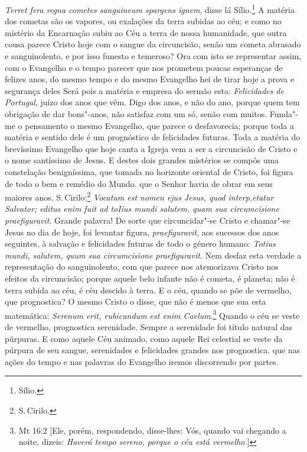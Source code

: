\emph{Terret fera regna cometes sanguineum spargens ignem}, disse lá
Sílio.\footnote{Sílio.} A matéria dos cometas são os vapores, ou exalações da terra
subidas ao céu; e como no mistério da Encarnação subiu ao Céu a terra de
nossa humanidade, que outra cousa parece Cristo hoje com o sangue da
circuncisão, senão um cometa abrasado e sanguinolento, e por isso
funesto e temeroso? Ora com isto se representar assim, com o Evangelho e
o tempo parecer que nos prometem poucas esperanças de felizes anos, do
mesmo tempo e do mesmo Evangelho hei de tirar hoje a prova e segurança
deles Será pois a matéria e empresa do sermão esta: \emph{Felicidades
de Portugal}, juízo dos anos que vêm. Digo dos anos, e não do ano,
porque quem tem obrigação de dar bons"-anos, não satisfaz com um só,
senão com muitos. Funda"-me o pensamento o mesmo Evangelho, que parece o
desfavorecia; porque toda a matéria e sentido dele é um prognóstico de
felicidades futuras.
Toda a matéria do brevíssimo Evangelho que hoje canta a Igreja vem a ser
a circuncisão de Cristo e o nome santíssimo de Jesus. E destes dois
grandes mistérios se compôs uma constelação benigníssima, que tomada no
horizonte oriental de Cristo, foi figura de todo o bem e remédio do
Mundo. que o Senhor havia de obrar em seus maiores anos. S.\,Cirilo:\footnote{S.\,Cirilo.}
\emph{Vocatum est nomen ejus Jesus, quod interp,etatur Salvator; editus
enim fuit ad toIius mundi salutem, quam sua circumcisione
praefiguravit}. Grande palavra! De sorte que circuncidar"-se Cristo e
chamar"-se Jesus no dia de hoje, foi levantar figura,
\emph{praefiguravit}, aos sucessos dos anos seguintes, à salvação e
felicidades futuras de todo o género humano: \emph{Totius mundi,
salutem, quum sua circumcisione praefiguravit}. Nem desfaz esta verdade
a representação do sanguinolento, com que parece nos atemorizava Cristo
nos efeitos da circuncisão; porque aquele belo infante não é cometa, é
planeta; não é terra subida ao céu, é céu descido à terra. E o céu,
quando se põe de vermelho, que prognostica? O mesmo Cristo o disse,
que não é menos que sua esta matemática: \emph{Serenum erit, rubicundum
est enim Caelum}.\footnote{Mt 16:2 [Ele, porém, respondendo, disse-lhes: Vós, quando vai chegando a noite, dizeis: \textit{Haverá tempo sereno, porque o céu está vermelho.}]} Quando o céu se veste de vermelho, prognostica
serenidade. Sempre a serenidade foi título natural das púrpuras. E como
aquele Céu animado, como aquele Rei celestial se veste da púrpura de seu
sangue, serenidades e felicidades grandes nos prognostica. que nas ações
do tempo e nas palavras do Evangelho iremos discorrendo por partes.


